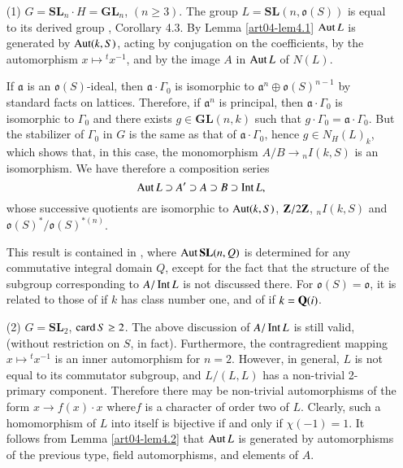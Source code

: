 \begin{examples}\label{art04-exams4.6}
\begin{itemize}
\item[(1)] $G=\mathbf{SL}_{n}\cdot H=\mathbf{GL}_{n}$, $(n\geq 3)$. The group $L=\mathbf{SL}(n,\mathfrak{o}(S))$ is equal to its derived group \cite{art04-key3}, Corollary 4.3. By Lemma \ref{art04-lem4.1} $\operatorname{\mathrm{Aut}} L$ is generated by $\operatorname{\mathrm{Aut}} (k,S)$, acting by conjugation on the coefficients, by the automorphism $x\mapsto {}^{t}x^{-1}$, and by the image $A$ in $\operatorname{\mathrm{Aut}} L$ of $N(L)$.

If $\mathfrak{a}$ is an $\mathfrak{o}(S)$-ideal, then $\mathfrak{a}\cdot \Gamma_{0}$ is isomorphic to $\mathfrak{a}^{n}\oplus \mathfrak{o}(S)^{n-1}$ by standard facts on lattices. Therefore, if $\mathfrak{a}^{n}$ is principal, then $\mathfrak{a}\cdot \Gamma_{0}$ is isomorphic to $\Gamma_{0}$ and there exists $g\in \mathbf{GL}(n,k)$ such that $g\cdot \Gamma_{0}=\mathfrak{a}\cdot \Gamma_{0}$. But the stabilizer of $\Gamma_{0}$ in $G$ is the same as that of $\mathfrak{a}\cdot \Gamma_{0}$, hence $g\in N_{H}(L)_{k}$, which shows that, in this case, the monomorphism $A/B\to {}_{n}I(k,S)$ is an isomorphism. We have therefore a composition series
$$
\operatorname{\mathrm{Aut}} L\supset A'\supset A\supset B\supset \operatorname{\mathrm{Int}} L,
$$
whose successive quotients are isomorphic to $\operatorname{\mathrm{Aut}}(k,S)$, $\mathbf{Z}/2\mathbf{Z}$, ${}_{n}I(k,S)$ and $\mathfrak{o}(S)^{*}/\mathfrak{o}(S)^{*(n)}$.

This result is contained in \cite{art04-key24}, where $\operatorname{\mathrm{Aut}} \mathbf{SL}(n,Q)$ is determined for any commutative integral domain $Q$, except for the fact that the structure of the subgroup corresponding to $A/\operatorname{\mathrm{Int}} L$ is not discussed there. For $\mathfrak{o}(S)=\mathfrak{o}$, it is related to those of \cite{art04-key19} if $k$ has class number one, and of \cite{art04-key20} if $k=\mathbf{Q}(i)$.

\item[(2)] $G=\mathbf{SL}_{2}$, $\operatorname{\mathrm{card}} S\geq 2$. The above discussion of $A/\operatorname{\mathrm{Int}} L$ is still valid, (without restriction on $S$, in fact). Furthermore, the contragredient mapping $x\mapsto {}^{t}x^{-1}$ is an inner automorphism for $n=2$. However, in general, $L$ is not equal to its commutator subgroup, and $L/(L,L)$ has a non-trivial 2-primary component. Therefore there may be non-trivial automorphisms of the form $x\to f(x)\cdot x$ where\pageoriginale $f$ is a character of order two of $L$. Clearly, such a homomorphism of $L$ into itself is bijective if and only if $\chi(-1)=1$. It follows from Lemma \ref{art04-lem4.2} that $\operatorname{\mathrm{Aut}} L$ is generated by automorphisms of the previous type, field automorphisms, and elements of $A$.


\end{itemize}
\end{examples}
